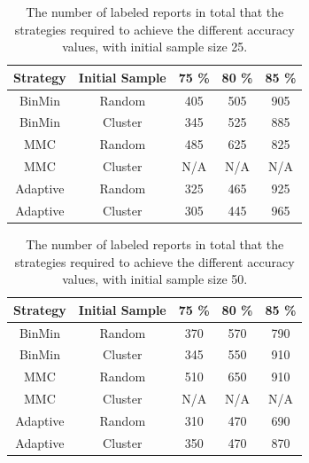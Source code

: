 
\begin{table}
    \centering
    \begin{tabular}{|ccccc|}
        \hline
        \textbf{Strategy} & \textbf{Initial Sample} & \textbf{75 \%} & \textbf{80 \%} & \textbf{85 \%}\\
        \hline
        BinMin & Random & 405 & 505 & 905\\
        BinMin & Cluster & 345 & 525 & 885\\
        MMC & Random & 485 & 625 & 825\\
        MMC & Cluster & N/A & N/A & N/A\\
        Adaptive & Random & 325 & 465 & 925\\
        Adaptive & Cluster & 305 & 445 & 965\\
        \hline
    \end{tabular}
    \caption{The number of labeled reports in total that the strategies required to achieve the different accuracy values, with initial sample size 25.}
    \label{tab:active-learning-accuracy-25}
\end{table}

\begin{table}
    \centering
    \begin{tabular}{|ccccc|}
        \hline
        \textbf{Strategy} & \textbf{Initial Sample} & \textbf{75 \%} & \textbf{80 \%} & \textbf{85 \%}\\
        \hline
        BinMin & Random & 370 & 570 & 790\\
        BinMin & Cluster & 345 & 550 & 910\\
        MMC & Random & 510 & 650 & 910\\
        MMC & Cluster & N/A & N/A & N/A\\
        Adaptive & Random & 310 & 470 & 690\\
        Adaptive & Cluster & 350 & 470 & 870\\
        \hline
    \end{tabular}
    \caption{The number of labeled reports in total that the strategies required to achieve the different accuracy values, with initial sample size 50.}
    \label{tab:active-learning-accuracy-50}
\end{table}

